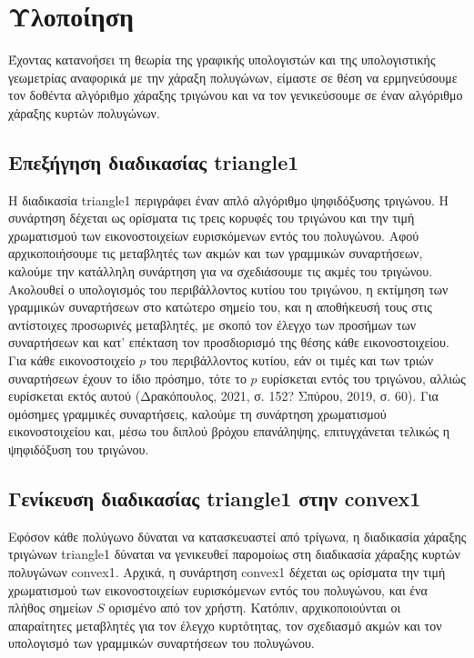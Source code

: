 \chapter{Υλοποίηση}

Έχοντας κατανοήσει τη θεωρία της γραφικής υπολογιστών και της υπολογιστικής γεωμετρίας αναφορικά με την χάραξη πολυγώνων, είμαστε σε θέση να ερμηνεύσουμε τον δοθέντα αλγόριθμο χάραξης τριγώνου και να τον γενικεύσουμε σε έναν αλγόριθμο χάραξης κυρτών πολυγώνων.

\section{Επεξήγηση διαδικασίας \textlatin{triangle1}}
H διαδικασία \textlatin{triangle1} περιγράφει έναν απλό αλγόριθμο ψηφιδόξυσης τριγώνου. Η συνάρτηση δέχεται ως ορίσματα τις τρεις κορυφές του τριγώνου και την τιμή χρωματισμού των εικονοστοιχείων ευρισκόμενων εντός του πολυγώνου. Αφού αρχικοποιήσουμε τις μεταβλητές των ακμών και των γραμμικών συναρτήσεων, καλούμε την κατάλληλη συνάρτηση για να σχεδιάσουμε τις ακμές του τριγώνου. Ακολουθεί ο υπολογισμός του περιβάλλοντος κυτίου του τριγώνου, η εκτίμηση των γραμμικών συναρτήσεων στο κατώτερο σημείο του, και η αποθήκευσή τους στις αντίστοιχες προσωρινές μεταβλητές, με σκοπό τον έλεγχο των προσήμων των συναρτήσεων και κατ’ επέκταση τον προσδιορισμό της θέσης κάθε εικονοστοιχείου. Για κάθε εικονοστοιχείο $p$ του περιβάλλοντος κυτίου, εάν οι τιμές και των τριών συναρτήσεων έχουν το ίδιο πρόσημο, τότε το $p$ ευρίσκεται εντός του τριγώνου, αλλιώς ευρίσκεται εκτός αυτού (Δρακόπουλος, 2021, σ. 152? Σπύρου, 2019, σ. 60). Για ομόσημες γραμμικές συναρτήσεις, καλούμε τη συνάρτηση χρωματισμού εικονοστοιχείου και, μέσω του διπλού βρόχου επανάληψης, επιτυγχάνεται τελικώς η ψηφιδόξυση του τριγώνου.

\section{Γενίκευση διαδικασίας \textlatin{triangle1} στην \textlatin{convex1}}
Εφόσον κάθε πολύγωνο δύναται να κατασκευαστεί από τρίγωνα, η διαδικασία χάραξης τριγώνων \textlatin{triangle1} δύναται να γενικευθεί παρομοίως στη διαδικασία χάραξης κυρτών πολυγώνων \textlatin{convex1}. Αρχικά, η συνάρτηση \textlatin{convex1} δέχεται ως ορίσματα την τιμή χρωματισμού των εικονοστοιχείων ευρισκόμενων εντός του πολυγώνου, και ένα πλήθος σημείων $S$ ορισμένο από τον χρήστη. Κατόπιν, αρχικοποιούνται οι απαραίτητες μεταβλητές για τον έλεγχο κυρτότητας, τον σχεδιασμό ακμών και τον υπολογισμό των γραμμικών συναρτήσεων του πολυγώνου. \par


